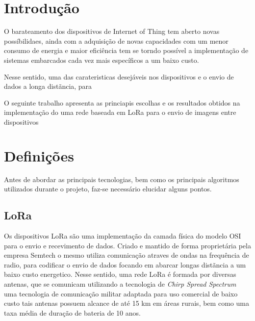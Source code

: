 \documentclass[
article,			%
12pt,				%
oneside,			%
a4paper,			%
english,			%
brazil,				%
sumario=tradicional
]{abntex2}
\begin{document}


\textual


\section{Introdução}
O barateamento dos dispositivos de Internet of Thing tem aberto novas possíbilidaes, ainda com a adquisição de novas capacidades com um menor consumo de energia e maior eficiência tem se torndo possível a implementação de sistemas embarcados cada vez mais específicos a um baixo custo.

Nesse sentido, uma das carateristicas desejáveis nos dispositivos e o envio de dados a longa distãncia, para

O seguinte trabalho apresenta as princiapis escolhas e os resultados obtidos na implementação do uma rede baseada em LoRa para o envio de imagens entre dispositivos 

\section{Definições}
Antes de abordar as principais tecnologias, bem como os principais algoritmos utilizados durante o projeto, faz-se necessário elucidar alguns pontos.

\subsection{LoRa}
Os dispositivos LoRa são uma implementação da camada física do modelo OSI para o envio e recevimento de dados. Criado e mantido de forma proprietária pela empresa Semtech o mesmo utiliza comunicação atraves de ondas na frequência de radio, para codificar o envio de dados focando em abarcar longas distãncia a um baixo custo energetico. Nesse sentido, uma rede LoRa é formada por diversas antenas\cite{siteLorawan}, que se comunicam utilizando a tecnologia de \textit{Chirp Spread Spectrum}\cite{davcev2018iot} uma tecnologia de comunicação militar adaptada para uso comercial de baixo custo\cite{siteLorawan} tais antenas possuem alcance de até 15 km em áreas rurais\cite{adelantado2017understanding}, bem como uma taxa média de duração de bateria de 10 anos\cite{adelantado2017understanding}.
\end{document}
